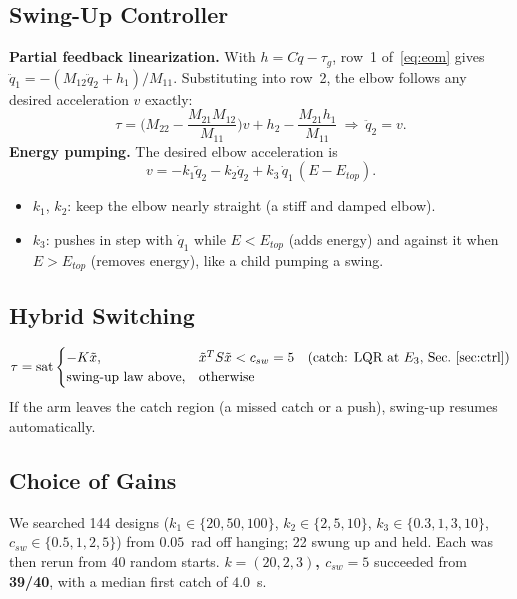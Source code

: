 \documentclass[12pt,a4paper]{article}
\begin{document}
\subsection{Swing-Up Controller}
\textbf{Partial feedback linearization.} With $h=C\dot q-\tau_g$, row~1 of~\eqref{eq:eom} gives $\ddot q_1=-(M_{12}\ddot q_2+h_1)/M_{11}$. Substituting into row~2, the elbow follows any desired acceleration $v$ exactly:
\begin{equation}
\tau=\Big(M_{22}-\frac{M_{21}M_{12}}{M_{11}}\Big)v+h_2-\frac{M_{21}h_1}{M_{11}}\ \Rightarrow\ \ddot q_2=v .
\end{equation}
\textbf{Energy pumping.} The desired elbow acceleration is
\begin{equation}
v=-k_1\tilde q_2-k_2\dot q_2+k_3\,\dot q_1\,(E-E_{top}) .\label{eq:v}
\end{equation}
\begin{itemize}
\item $k_1$, $k_2$: keep the elbow nearly straight (a stiff and damped elbow).
\item $k_3$: pushes in step with $\dot q_1$ while $E<E_{top}$ (adds energy) and against it when $E>E_{top}$ (removes energy), like a child pumping a swing.
\end{itemize}

\subsection{Hybrid Switching}
\begin{equation}
\tau=\operatorname{sat}\begin{cases}-K\tilde x, & \tilde x^TS\tilde x<c_{sw}=5\quad\text{(catch: LQR at $E_3$, Sec.~\ref{sec:ctrl})}\\ \text{swing-up law above}, & \text{otherwise}\end{cases}
\end{equation}
If the arm leaves the catch region (a missed catch or a push), swing-up resumes automatically.

\subsection{Choice of Gains}
We searched 144 designs ($k_1\in\{20,50,100\}$, $k_2\in\{2,5,10\}$, $k_3\in\{0.3,1,3,10\}$, $c_{sw}\in\{0.5,1,2,5\}$) from $0.05$~rad off hanging; 22 swung up and held. Each was then rerun from 40 random starts. \textbf{$k=(20,2,3)$, $c_{sw}=5$} succeeded from \textbf{39/40}, with a median first catch of $4.0$~s.
\end{document}
